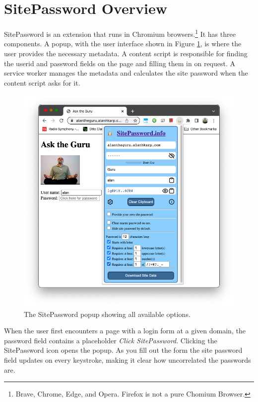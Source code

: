 \section{SitePassword Overview}\label{overview}

SitePassword is an extension that runs in Chromium browsers.\footnote{Brave, 
Chrome, Edge, and Opera.  Firefox is not a pure Chomium Browser.}  
It has three components.  A popup, with the user interface shown in 
Figure \ref{fig:popup}, is where the user provides the necessary metadata.  A
content script is responsible for finding the userid and password fields on the page
and filling them in on request.  A service worker manages the metadata and 
calculates the site password when the content script asks for it.  

\begin{figure}
\begin{center}
  \includegraphics[scale=0.20]{soupsfig1.png}
\end{center}
\caption{\label{fig:popup} The SitePassword popup showing all available
options. }
\end{figure}

When the user first encounters a page with a login form at a given domain, 
the password field contains a placeholder {\em Click SitePassword}.  Clicking
the SitePassword icon opens the popup.  As you fill out the form the site
password field updates on every keystroke, making it clear how uncorrelated
the passwords are.

